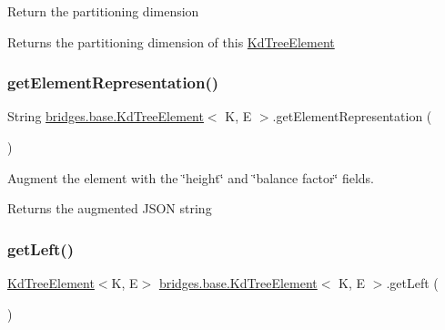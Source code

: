 Return the partitioning dimension

\begin{DoxyReturn}{Returns}
the partitioning dimension of this \hyperlink{classbridges_1_1base_1_1_kd_tree_element}{Kd\+Tree\+Element} 
\end{DoxyReturn}
\mbox{\label{classbridges_1_1base_1_1_kd_tree_element_adf9bed8c71a7c257a1359c3c88b808f0}} 
\subsubsection{\texorpdfstring{get\+Element\+Representation()}{getElementRepresentation()}}
{\footnotesize\ttfamily String \hyperlink{classbridges_1_1base_1_1_kd_tree_element}{bridges.\+base.\+Kd\+Tree\+Element}$<$ K, E $>$.get\+Element\+Representation (\begin{DoxyParamCaption}{ }\end{DoxyParamCaption})}

Augment the element with the \char`\"{}height\char`\"{} and \char`\"{}balance factor\char`\"{} fields.

\begin{DoxyReturn}{Returns}
the augmented J\+S\+ON string 
\end{DoxyReturn}
\mbox{\label{classbridges_1_1base_1_1_kd_tree_element_a257367edc8f204c973eb277dcb5d37be}} 
\subsubsection{\texorpdfstring{get\+Left()}{getLeft()}}
{\footnotesize\ttfamily \hyperlink{classbridges_1_1base_1_1_kd_tree_element}{Kd\+Tree\+Element}$<$K, E$>$ \hyperlink{classbridges_1_1base_1_1_kd_tree_element}{bridges.\+base.\+Kd\+Tree\+Element}$<$ K, E $>$.get\+Left (\begin{DoxyParamCaption}{ }\end{DoxyParamCaption})}

